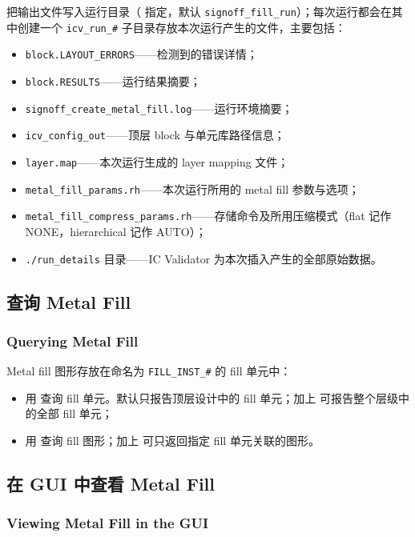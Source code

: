  把输出文件写入运行目录（ 指定，默认 \texttt{signoff\_fill\_run}）；每次运行都会在其中创建一个 \texttt{icv\_run\_\#} 子目录存放本次运行产生的文件，主要包括：
\begin{itemize}
  \item \texttt{block.LAYOUT\_ERRORS}——检测到的错误详情；
  \item \texttt{block.RESULTS}——运行结果摘要；
  \item \texttt{signoff\_create\_metal\_fill.log}——运行环境摘要；
  \item \texttt{icv\_config\_out}——顶层 block 与单元库路径信息；
  \item \texttt{layer.map}——本次运行生成的 layer mapping 文件；
  \item \texttt{metal\_fill\_params.rh}——本次运行所用的 metal fill 参数与选项；
  \item \texttt{metal\_fill\_compress\_params.rh}——存储命令及所用压缩模式（flat 记作 NONE，hierarchical 记作 AUTO）；
  \item \texttt{./run\_details} 目录——IC Validator 为本次插入产生的全部原始数据。
\end{itemize}

\subsection{查询 Metal Fill}
\subsubsection*{Querying Metal Fill}

Metal fill 图形存放在命名为 \texttt{FILL\_INST\_\#} 的 fill 单元中：
\begin{itemize}
  \item 用  查询 fill 单元。默认只报告顶层设计中的 fill 单元；加上  可报告整个层级中的全部 fill 单元；
  \item 用  查询 fill 图形；加上  可只返回指定 fill 单元关联的图形。
\end{itemize}

\subsection{在 GUI 中查看 Metal Fill}
\subsubsection*{Viewing Metal Fill in the GUI}

